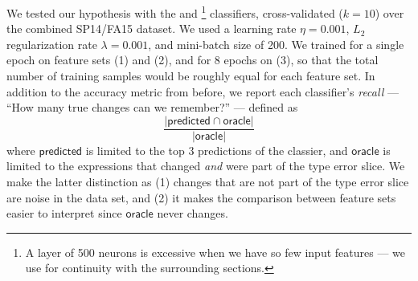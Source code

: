 We tested our hypothesis with the \linear and
%
\hiddenFH\footnote{A layer of 500 neurons is excessive when we have so few
  input features --- we use \hiddenFH for continuity with the
  surrounding sections.}
%
classifiers, cross-validated ($k=10$) over the combined SP14/FA15
dataset. We used a learning rate $\eta=0.001$, $L_2$ regularization rate
$\lambda=0.001$, and mini-batch size of 200. We trained for a single
epoch on feature sets (1) and (2), and for 8 epochs on (3), so that the
total number of training samples would be roughly equal for each feature
set.
%
\lstDeleteShortInline{|} %
In addition to the accuracy metric from before, we report each
classifier's \emph{recall} --- \ie ``How many true changes can we
remember?'' --- defined as
$$
\frac{|\mathsf{predicted} \cap \mathsf{oracle}|}
     {|\mathsf{oracle}|}
$$
where $\mathsf{predicted}$ is limited to the top 3 predictions of the
classier, and $\mathsf{oracle}$ is limited to the expressions that
changed \emph{and} were part of the type error slice. We make the
latter distinction as (1) changes that are not part of the type error
slice are noise in the data set, and (2) it makes the comparison between
feature sets easier to interpret since $\mathsf{oracle}$ never changes.
\lstMakeShortInline{|}
%


